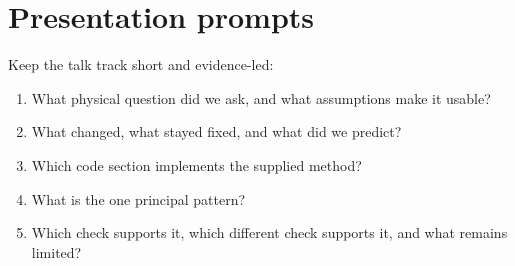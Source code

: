 \documentclass[11pt,a4paper]{article}
\begin{document}
\section*{Presentation prompts}
Keep the talk track short and evidence-led:
\begin{enumerate}[nosep,leftmargin=6mm]
\item What physical question did we ask, and what assumptions make it usable?
\item What changed, what stayed fixed, and what did we predict?
\item Which code section implements the supplied method?
\item What is the one principal pattern?
\item Which check supports it, which different check supports it, and what remains limited?
\end{enumerate}
\end{document}
